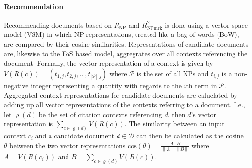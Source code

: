 \paragraph{Recommendation} Recommending documents based on ${R_{\text{NP}}}$ and ${R_{\text{NPmrk}}^{2+}}$ is done using a vector space model (VSM) in which NP representations, treated like a bag of words (BoW), are compared by their cosine similarities. Representations of candidate documents are, likewise to the FoS based model, aggregrates over all contexts referencing the document. Formally, the vector representation of a context is given by $V(R(c)) = (t_{1,j}, t_{2,j}, ..., t_{|\mathcal{P}|,j})$ where $\mathcal{P}$ is the set of all NPs %
and $t_{i,j}$ is a non-negative integer representing a quantity with regards to the $i$th term in $\mathcal{P}$. Aggregated context representations for candidate documents are caluclated by adding up all vector representations of the contexts referring to a document. I.e., let $\varrho(d)$ be the set of citation contexts referencing $d$, then $d$'s vector representation is $\sum\limits_{c \in \varrho(d)} V(R(c))$. The similarity between an input context $c_i$ and a candidate document $d\in \mathcal{D}$ can then be calculated as the cosine $\theta$ between the two vector representations ${\mathrm{cos}(\theta)=\frac{A\cdot B}{\|A\| \|B\|}}$ where  $A=V(R(c_i))$ and $B=\sum\limits_{c \in \varrho(d)} V(R(c))$.

